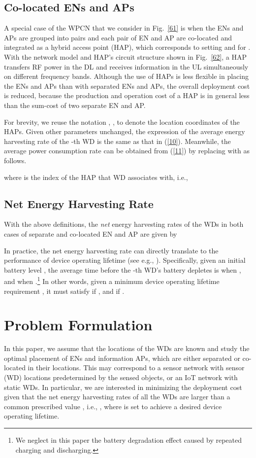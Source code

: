 \documentclass[journal, draftcls, one column, 12pt]{IEEEtran}
\begin{document}
\subsection{Co-located ENs and APs}
A special case of the WPCN that we consider in Fig.~\ref{61} is when the ENs and APs are grouped into pairs and each pair of EN and AP are co-located and integrated as a hybrid access point (HAP), which corresponds to setting  and  for . With the network model and HAP's circuit structure shown in Fig.~\ref{62}, a HAP transfers RF power in the DL and receives information in the UL simultaneously on different frequency bands. Although the use of HAPs is less flexible in placing the ENs and APs than with separated ENs and APs, the overall deployment cost is reduced, because the production and operation cost of a HAP is in general less than the sum-cost of two separate EN and AP.

For brevity, we reuse the notation , , to denote the location coordinates of the  HAPs. Given other parameters unchanged, the expression of the average energy harvesting rate  of the -th WD is the same as that in (\ref{10}). Meanwhile, the average power consumption rate  can be obtained from (\ref{11}) by replacing  with  as follows.

where  is the index of the HAP that WD  associates with, i.e.,


\subsection{Net Energy Harvesting Rate}
With the above definitions, the \textit{net} energy harvesting rates of the WDs in both cases of separate and co-located EN and AP are given by

In practice, the net energy harvesting rate can directly translate to the performance of device operating lifetime (see e.g., \cite{2015:Bi}). Specifically, given an initial battery level , the average time before the -th WD's battery depletes is  when , and  when .\footnote{We neglect in this paper the battery degradation effect \cite{2013:Michelusi} caused by repeated charging and discharging.} In other words, given a minimum device operating lifetime requirement , it must satisfy  if , and  if .


\section{Problem Formulation}\label{sec:PrbForm}
In this paper, we assume that the locations of the WDs are known and study the optimal placement of ENs and information APs, which are either separated or co-located in their locations. This may correspond to a sensor network with sensor (WD) locations predetermined by the sensed objects, or an IoT network with static WDs. In particular, we are interested in minimizing the deployment cost given that the net energy harvesting rates of all the WDs are larger than a common prescribed value , i.e., , where  is set to achieve a desired device operating lifetime.
\end{document}
